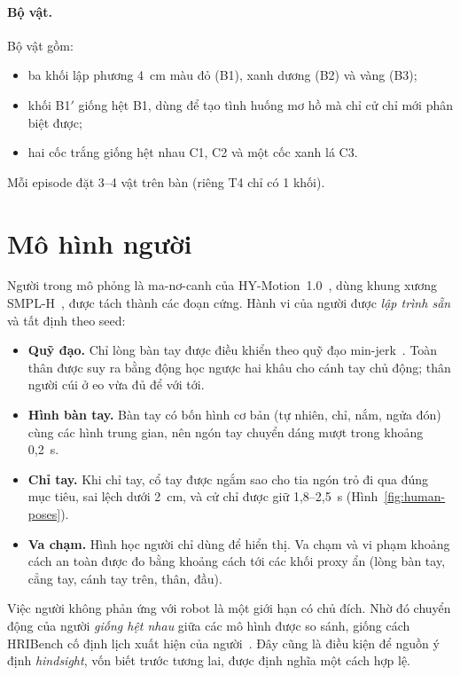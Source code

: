 \paragraph{Bộ vật.} Bộ vật gồm:
\begin{itemize}
  \item ba khối lập phương 4~cm màu đỏ (B1), xanh dương (B2) và vàng (B3);
  \item khối B1$'$ giống hệt B1, dùng để tạo tình huống mơ hồ mà chỉ cử chỉ mới phân biệt được;
  \item hai cốc trắng giống hệt nhau C1, C2 và một cốc xanh lá C3.
\end{itemize}
Mỗi episode đặt 3--4 vật trên bàn (riêng T4 chỉ có 1 khối).

\section{Mô hình người}
\label{sec:human}

Người trong mô phỏng là ma-nơ-canh của HY-Motion~1.0~\cite{wen2025hymotion}, dùng khung xương SMPL-H~\cite{romero2017mano}, được tách thành các đoạn cứng. Hành vi của người được \emph{lập trình sẵn} và tất định theo seed:
\begin{itemize}
  \item \textbf{Quỹ đạo.} Chỉ lòng bàn tay được điều khiển theo quỹ đạo min-jerk~\cite{flash1985minjerk}. Toàn thân được suy ra bằng động học ngược hai khâu cho cánh tay chủ động; thân người cúi ở eo vừa đủ để với tới.
  \item \textbf{Hình bàn tay.} Bàn tay có bốn hình cơ bản (tự nhiên, chỉ, nắm, ngửa đón) cùng các hình trung gian, nên ngón tay chuyển dáng mượt trong khoảng 0,2~s.
  \item \textbf{Chỉ tay.} Khi chỉ tay, cổ tay được ngắm sao cho tia ngón trỏ đi qua đúng mục tiêu, sai lệch dưới 2~cm, và cử chỉ được giữ 1,8--2,5~s (Hình~\ref{fig:human-poses}).
  \item \textbf{Va chạm.} Hình học người chỉ dùng để hiển thị. Va chạm và vi phạm khoảng cách an toàn được đo bằng khoảng cách tới các khối proxy ẩn (lòng bàn tay, cẳng tay, cánh tay trên, thân, đầu).
\end{itemize}

Việc người không phản ứng với robot là một giới hạn có chủ đích. Nhờ đó chuyển động của người \emph{giống hệt nhau} giữa các mô hình được so sánh, giống cách HRIBench cố định lịch xuất hiện của người~\cite{liu2026hribench}. Đây cũng là điều kiện để nguồn ý định \emph{hindsight}, vốn biết trước tương lai, được định nghĩa một cách hợp lệ.

